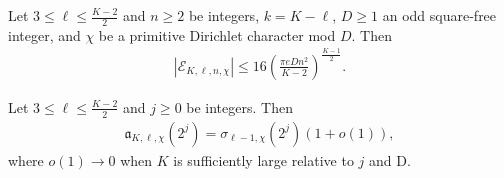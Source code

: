 \documentclass[10pt,a4paper]{amsart}
\begin{document}
\begin{lemma}\label{lem:bdDtermprod}
    Let $3\leq\ell\leq\frac{K-2}{2}$ and $n\geq2$ be integers, $k=K-\ell$, $D\geq1$ an odd square-free integer, and $\chi$ be a primitive Dirichlet character mod $D$. Then
     \begin{align*}
         |\mathscr{E}_{K,\ell,n,\chi}|\leq 16\left(\frac{\pi eDn^2}{K-2}\right)^{\frac{K-1}{2}}.
     \end{align*}
\end{lemma}

\begin{proposition}\label{prop:asymptoticA}
    Let $3\leq\ell\leq\frac{K-2}{2}$ and $j\geq0$  be integers. Then 
    \begin{align*}
        \mathfrak{a}_{K,\ell,\chi}(2^j)=\sigma_{\ell-1,\chi}(2^{j})(1+o(1)),
    \end{align*}
    where $o(1)\rightarrow 0$ when $K$ is sufficiently large relative to $j$ and D.
\end{proposition}
\end{document}

